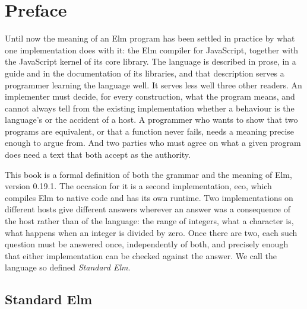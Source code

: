 
\chapter*{Preface}

Until now the meaning of an Elm program has been settled in practice by what
one implementation does with it: the Elm compiler for JavaScript, together
with the JavaScript kernel of its core library. The language is described in
prose, in a guide and in the documentation of its libraries, and that
description serves a programmer learning the language well. It serves less
well three other readers. An implementer must decide, for every construction,
what the program means, and cannot always tell from the existing
implementation whether a behaviour is the language's or the accident of a
host. A programmer who wants to show that two programs are equivalent, or
that a function never fails, needs a meaning precise enough to argue from.
And two parties who must agree on what a given program does need a text that
both accept as the authority.

This book is a formal definition of both the grammar and the meaning of Elm,
version 0.19.1. The occasion for it is a second implementation, eco, which
compiles Elm to native code and has its own runtime. Two implementations on
different hosts give different answers wherever an answer was a consequence
of the host rather than of the language: the range of integers, what a
character is, what happens when an integer is divided by zero. Once there
are two, each such question must be answered once, independently of both,
and precisely enough that either implementation can be checked against the
answer. We call the language so defined \emph{Standard Elm}.

\section*{Standard Elm}

